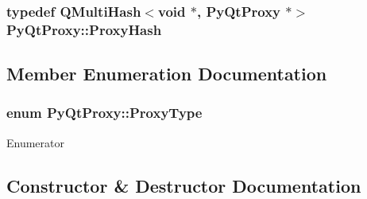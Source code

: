 \subsubsection[{Proxy\+Hash}]{\setlength{\rightskip}{0pt plus 5cm}typedef Q\+Multi\+Hash$<$void $\ast$, {\bf Py\+Qt\+Proxy} $\ast$$>$ {\bf Py\+Qt\+Proxy\+::\+Proxy\+Hash}}\label{classPyQtProxy_a85a17352880746150574caab4dafdeb4}


\subsection{Member Enumeration Documentation}
\hypertarget{classPyQtProxy_a785c9cec24cf6c5066d38606aec42d19}{}
\subsubsection[{Proxy\+Type}]{\setlength{\rightskip}{0pt plus 5cm}enum {\bf Py\+Qt\+Proxy\+::\+Proxy\+Type}}\label{classPyQtProxy_a785c9cec24cf6c5066d38606aec42d19}
\begin{Desc}
\item[Enumerator]\par
\begin{description}
\item[{\em 
\hypertarget{classPyQtProxy_a785c9cec24cf6c5066d38606aec42d19a832638d3c94b219f19b55d55f1aea78f}{}Proxy\+Slot\label{classPyQtProxy_a785c9cec24cf6c5066d38606aec42d19a832638d3c94b219f19b55d55f1aea78f}
}]\item[{\em 
\hypertarget{classPyQtProxy_a785c9cec24cf6c5066d38606aec42d19a00a4eecf6fbb51cefe515aa35842dc92}{}Proxy\+Signal\label{classPyQtProxy_a785c9cec24cf6c5066d38606aec42d19a00a4eecf6fbb51cefe515aa35842dc92}
}]\end{description}
\end{Desc}


\subsection{Constructor \& Destructor Documentation}
\hypertarget{classPyQtProxy_aa238baaedaf8a815c8d3b61131645128}{}
